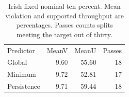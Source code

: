 \begin{table}[!ht]
\centering\small
\caption{Irish fixed nominal ten percent. Mean violation and supported throughput are percentages. Passes counts splits meeting the target out of thirty.}
\begin{tabular}{lrrr}
\hline
Predictor & MeanV & MeanU & Passes \\
Global & 9.60 & 55.60 & 18 \\
Minimum & 9.72 & 52.81 & 17 \\
Persistence & 9.71 & 59.44 & 18 \\
\hline
\end{tabular}
\end{table}
